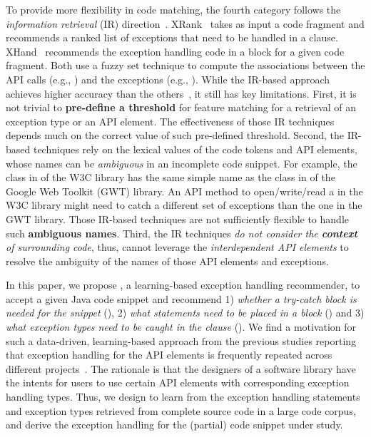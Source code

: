 To provide more flexibility in code matching, the fourth category
follows the {\em information retrieval} (IR)
direction~\cite{xrank-fse20}. XRank~\cite{xrank-fse20} takes as input
a code fragment and recommends a ranked list of exceptions that need
to be handled in a  clause. XHand~\cite{xrank-fse20}
recommends the exception handling code in a  block for a
given code fragment. Both use a fuzzy set technique to compute the
associations between the API calls (e.g.,
) and the exceptions (e.g.,
). While the IR-based approach achieves higher
accuracy than the others~\cite{xrank-fse20}, it still has key
limitations. First, it is not trivial to {\bf pre-define a threshold}
for feature matching for a retrieval of an exception type or an API
element. The effectiveness of those IR techniques depends much on the
correct value of such pre-defined threshold. Second, the IR-based
techniques rely on the lexical values of the code tokens and API
elements, whose names can be {\em ambiguous} in an incomplete code
snippet. For example, the  class in
 of the W3C library has the same simple name as
the  class in
 of the Google Web
Toolkit (GWT) library. An API method to open/write/read a
 in the W3C library might need to catch a different set
of exceptions than the one in the GWT library. Those IR-based
techniques are not sufficiently flexible to handle such {\bf ambiguous
  names}. Third, the IR techniques {\em do not consider the {\bf
    context} of surrounding code}, thus, cannot leverage the {\em
  interdependent API elements} to resolve the ambiguity of the names
of those API elements and exceptions.

In this paper, we propose {\tool}, a learning-based exception handling
recommender, to accept a given Java code snippet and recommend 1) {\em
  whether a try-catch block is needed for the snippet} ({\xblock}), 2)
{\em what statements need to be placed in a  block}
({\xstate}) and 3) {\em what exception types need to be caught in the
   clause} ({\xtype}).  We find a motivation for such a
data-driven, learning-based approach from the previous studies
reporting that exception handling for the API elements is frequently
repeated across different
projects~\cite{chanchal-scam14,zhong-jss18}. The rationale is that the
designers of a software library have the intents for users to use
certain API elements with corresponding exception handling types.
Thus, we design {\tool} to learn from the exception handling
statements and exception types retrieved from complete source code in
a large code corpus, and derive the exception handling for the
(partial) code snippet under study.

